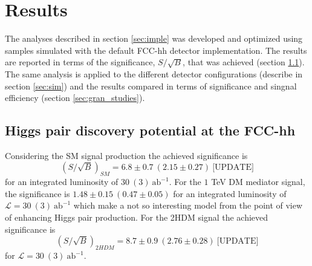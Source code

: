 
\section{Results}
\label{sec:resul}


The analyses described in section \ref{sec:imple} was developed and optimized using samples simulated with the default FCC-hh detector implementation. The results are reported in terms of the significance, $S/\sqrt{B}$, that was achieved (section \ref{sec:results_FCC}). The same analysis is applied to the different detector configurations (describe in section \ref{sec:sim}) and the results compared in terms of significance and singnal efficiency (section \ref{sec:gran_studies}).  

\subsection{Higgs pair discovery potential at the FCC-hh}
\label{sec:results_FCC}

Considering the SM signal production the achieved significance is
\begin{equation}
	(S/\sqrt{B})_{SM}=6.8\pm0.7 ~(2.15\pm0.27) ~\text{[UPDATE]}
\end{equation}
for an integrated luminosity of $30~(3)~\text{ab}^{-1}$. For the $1$ TeV DM mediator signal, the significance is $1.48 \pm 0.15~(0.47 \pm 0.05)$ for an integrated luminosity of $\mathcal{L}=30~(3)~\text{ab}^{-1}$ which make a not so interesting model from the point of view of enhancing Higgs pair production. For the 2HDM signal the achieved significance is 
\begin{equation}
(S/\sqrt{B})_{2HDM}=8.7 \pm 0.9~(2.76 \pm 0.28) ~\text{[UPDATE]}
\end{equation}
for $\mathcal{L}=30~(3)~\text{ab}^{-1}$.

